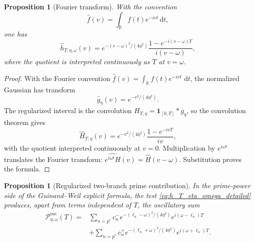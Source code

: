 \documentclass[11pt]{amsart}
\numberwithin{equation}{section}
\theoremstyle{plain}
\newtheorem{proposition}[theorem]{Proposition}
\theoremstyle{definition}
\theoremstyle{remark}
\newcommand{\1}{\mathbf{1}}
\newcommand{\dd}{\,\mathrm{d}}
\newcommand{\cP}{\mathcal P}
\begin{document}
\begin{proposition}[Fourier transform]
\label{prop:gaussian_fourier_transform}
With the convention
\begin{equation}
\widehat f(v)=\int_{\mathbb R}f(t)e^{-ivt}\dd t,
\label{eq:fourier_convention}
\end{equation}
one has
\begin{equation}
\boxed{
\widehat h_{T,\eta,\omega}(v)
=
e^{-(v-\omega)^2/(4\eta^2)}
\frac{1-e^{-i(v-\omega)T}}{i(v-\omega)},
}
\label{eq:exact_gaussian_fourier_transform}
\end{equation}
where the quotient is interpreted continuously as $T$ at $v=\omega$.
\end{proposition}

\begin{proof}
With the Fourier convention
\(\widehat f(v)=\int_{\mathbb R}f(t)e^{-ivt}\,\dd t\), the normalized
Gaussian has transform
\begin{equation}
\widehat g_\eta(v)=e^{-v^2/(4\eta^2)}.
\label{eq:gaussian_transform_proof}
\end{equation}
The regularized interval is the convolution
\(H_{T,\eta}=\1_{[0,T]}*g_\eta\), so the convolution theorem gives
\begin{equation}
\widehat H_{T,\eta}(v)
=
e^{-v^2/(4\eta^2)}
\frac{1-e^{-ivT}}{iv},
\label{eq:interval_gaussian_transform_proof}
\end{equation}
with the quotient interpreted continuously at \(v=0\).  Multiplication by
\(e^{i\omega t}\) translates the Fourier transform:
\(\widehat{e^{i\omega t}H}(v)=\widehat H(v-\omega)\).  Substitution proves
the formula.
\end{proof}

\begin{proposition}[Regularized two-branch prime contribution]
\label{prop:regularized_two_branches}
In the prime-power side of the Guinand--Weil explicit formula, the test
\eqref{eq:h_T_eta_omega_detailed} produces, apart from terms independent of
$T$, the oscillatory sum
\begin{align}
\cP_{\eta,\omega}^{\mathrm{osc}}(T)
={}&
\sum_{n=p^r}
c_n^-e^{-(\ell_n-\omega)^2/(4\eta^2)}
e^{i(\omega-\ell_n)T}
\label{eq:regularized_minus_branch}
\\
&+
\sum_{n=p^r}
c_n^+e^{-(\ell_n+\omega)^2/(4\eta^2)}
e^{i(\omega+\ell_n)T}.
\label{eq:regularized_plus_branch}
\end{align}
\end{proposition}
\end{document}

